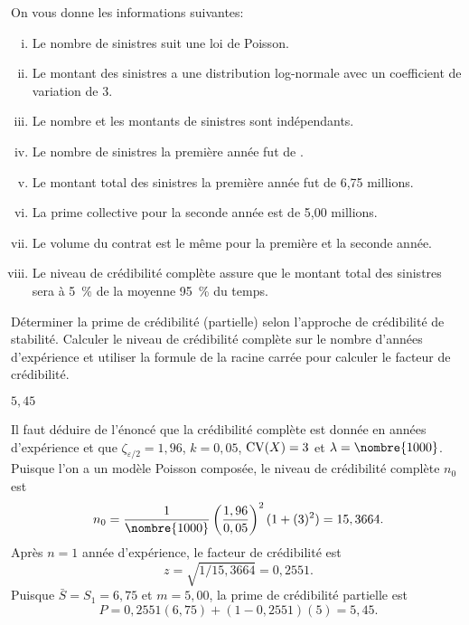 \begin{exercice}
  On vous donne les informations suivantes:
  \begin{enumerate}[(i)]
  \item Le nombre de sinistres suit une loi de Poisson.
  \item Le montant des sinistres a une distribution log-normale avec un
    coefficient de variation de 3.
  \item Le nombre et les montants de sinistres sont indépendants.
  \item Le nombre de sinistres la première année fut de .
  \item Le montant total des sinistres la première année fut de 6,75
    millions.
  \item La prime collective pour la seconde année est de 5,00
    millions.
  \item Le volume du contrat est le même pour la première et la
    seconde année.
  \item Le niveau de crédibilité complète assure que le montant total
    des sinistres sera à 5~\% de la moyenne 95~\% du temps.
  \end{enumerate}
  Déterminer la prime de crédibilité (partielle) selon l'approche de
  crédibilité de stabilité. Calculer le niveau de crédibilité complète
  sur le nombre d'années d'expérience et utiliser la formule de la
  racine carrée pour calculer le facteur de crédibilité.
  \begin{rep}
    $5,45$
  \end{rep}
  \begin{sol}
    Il faut déduire de l'énoncé que la crédibilité complète est donnée
    en années d'expérience et que $\zeta_{\varepsilon/2} = 1,96$, $k =
    0,05$, $\operatorname{CV}(X) = 3$ et $\lambda = \nombre{1000}$. Puisque
    l'on a un modèle Poisson composée, le niveau de crédibilité
    complète $n_0$ est
    \begin{displaymath}
      n_0 =
      \frac{1}{\nombre{1000}}
      \left( \frac{1,96}{0,05} \right)^2
      (1 + (3)^2) =
      15,3664.
    \end{displaymath}
    Après $n = 1$ année d'expérience, le facteur de crédibilité est
    \begin{equation*}
      z = \sqrt{1/15,3664} = 0,2551.
    \end{equation*}
    Puisque $\bar{S} = S_1 = 6,75$ et $m = 5,00$, la prime de
    crédibilité partielle est
    \begin{displaymath}
      P = 0,2551 (6,75) + (1 - 0,2551) (5) = 5,45.
    \end{displaymath}
  \end{sol}
\end{exercice}

